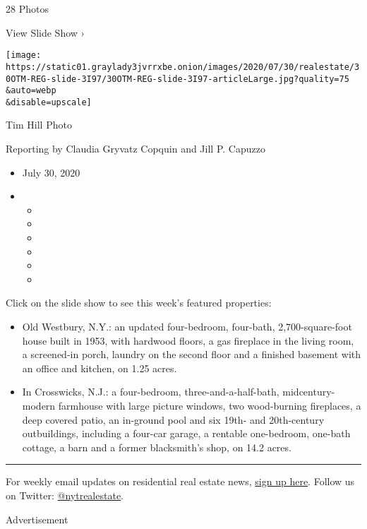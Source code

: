 28 Photos

View Slide Show ›

\texttt{[image: https://static01.graylady3jvrrxbe.onion/images/2020/07/30/realestate/30OTM-REG-slide-3I97/30OTM-REG-slide-3I97-articleLarge.jpg?quality=75\\\&auto=webp\\\&disable=upscale]}

Tim Hill Photo

Reporting by Claudia Gryvatz Copquin and Jill P. Capuzzo

\begin{itemize}
\item
  July 30, 2020
\item
  \begin{itemize}
  \item
  \item
  \item
  \item
  \item
  \item
  \end{itemize}
\end{itemize}

Click on the slide show to see this week's featured properties:

\begin{itemize}
\item
  Old Westbury, N.Y.: an updated four-bedroom, four-bath,
  2,700-square-foot house built in 1953, with hardwood floors, a gas
  fireplace in the living room, a screened-in porch, laundry on the
  second floor and a finished basement with an office and kitchen, on
  1.25 acres.
\item
  In Crosswicks, N.J.: a four-bedroom, three-and-a-half-bath,
  midcentury-modern farmhouse with large picture windows, two
  wood-burning fireplaces, a deep covered patio, an in-ground pool and
  six 19th- and 20th-century outbuildings, including a four-car garage,
  a rentable one-bedroom, one-bath cottage, a barn and a former
  blacksmith's shop, on 14.2 acres.
\end{itemize}

\begin{center}\rule{0.5\linewidth}{\linethickness}\end{center}

For weekly email updates on residential real estate news,
\href{http://www.nytimes3xbfgragh.onion/newsletters/realestate/}{sign up
here}. Follow us on Twitter:
\href{https://twitter.com/nytrealestate}{@nytrealestate}.

Advertisement

